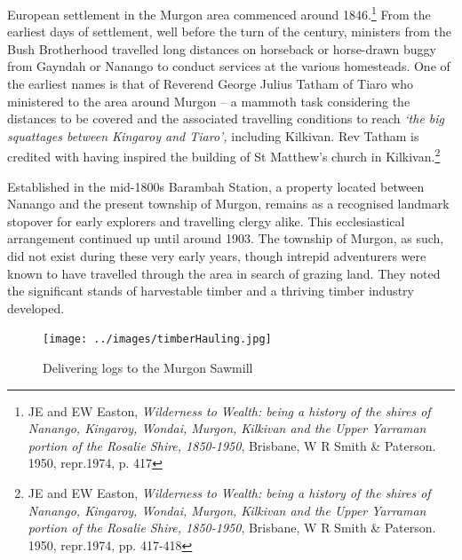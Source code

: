 European settlement in the Murgon area commenced around 1846.\footnote{JE and EW Easton, \emph{Wilderness to Wealth: being a history of the shires of Nanango, Kingaroy, Wondai, Murgon, Kilkivan and the Upper Yarraman portion of the Rosalie Shire, 1850-1950}, Brisbane, W R Smith \& Paterson. 1950, repr.1974, p. 417} From the earliest days of settlement, well before the turn of the century, ministers from the Bush Brotherhood travelled long distances on horseback or horse-drawn buggy from Gayndah or Nanango to conduct services at the various homesteads. One of the earliest names is that of Reverend George Julius Tatham of Tiaro who ministered to the area around Murgon -- a mammoth task considering the distances to be covered and the associated travelling conditions to reach \emph{`the big squattages between Kingaroy and Tiaro',} including Kilkivan. Rev Tatham is credited with having inspired the building of St Matthew's church in Kilkivan.\footnote{JE and EW Easton, \emph{Wilderness to Wealth: being a history of the shires of Nanango, Kingaroy, Wondai, Murgon, Kilkivan and the Upper Yarraman portion of the Rosalie Shire, 1850-1950}, Brisbane, W R Smith \& Paterson. 1950, repr.1974, pp. 417-418}


Established in the mid-1800s Barambah Station, a property located between Nanango and the present township of Murgon, remains as a recognised landmark stopover for early explorers and travelling clergy alike. This ecclesiastical arrangement continued up until around 1903. The township of Murgon, as such, did not exist during these very early years, though intrepid adventurers were known to have travelled through the area in search of grazing land. They noted the significant stands of harvestable timber and a thriving timber industry developed.









\begin{figure}
\begin{center}
\texttt{[image: ../images/timberHauling.jpg]}
\caption{Delivering logs to the Murgon Sawmill}
\end{center}
\end{figure}





